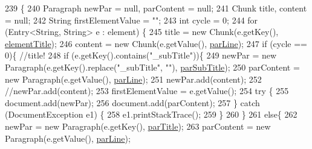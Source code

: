 \begin{DoxyCode}
239                                                                                      \{
240         Paragraph newPar = null, parContent = null;
241         Chunk title, content = null;
242         String firstElementValue = \textcolor{stringliteral}{""};
243         \textcolor{keywordtype}{int} cycle = 0;
244         \textcolor{keywordflow}{for} (Entry<String, String> e : element) \{
245             title = \textcolor{keyword}{new} Chunk(e.getKey(), \hyperlink{classit_1_1isislab_1_1masonassisteddocumentation_1_1mason_1_1control_1_1_pdf_rtf_generator_aa954332a7d987f1b6b8957fa25ee6190}{elementTitle});
246             content = \textcolor{keyword}{new} Chunk(e.getValue(), \hyperlink{classit_1_1isislab_1_1masonassisteddocumentation_1_1mason_1_1control_1_1_pdf_rtf_generator_ae24c4a1666a5d601e16f3c3cb7a81fdb}{parLine});
247             \textcolor{keywordflow}{if} (cycle == 0)\{    \textcolor{comment}{//title!}
248                 \textcolor{keywordflow}{if} (e.getKey().contains(\textcolor{stringliteral}{"\_subTitle"}))\{
249                     newPar = \textcolor{keyword}{new} Paragraph(e.getKey().replace(\textcolor{stringliteral}{"\_subTitle"}, \textcolor{stringliteral}{""}), 
      \hyperlink{classit_1_1isislab_1_1masonassisteddocumentation_1_1mason_1_1control_1_1_pdf_rtf_generator_ae31536bac40b23df15fbb252e60c03bb}{parSubTitle});
250                     parContent = \textcolor{keyword}{new} Paragraph(e.getValue(), \hyperlink{classit_1_1isislab_1_1masonassisteddocumentation_1_1mason_1_1control_1_1_pdf_rtf_generator_ae24c4a1666a5d601e16f3c3cb7a81fdb}{parLine});
251                     newPar.add(content);
252                     \textcolor{comment}{//newPar.add(content);}
253                     firstElementValue = e.getValue();
254                     \textcolor{keywordflow}{try} \{
255                         document.add(newPar);
256                         document.add(parContent);
257                     \} \textcolor{keywordflow}{catch} (DocumentException e1) \{
258                         e1.printStackTrace();
259                     \}
260                 \}
261                 \textcolor{keywordflow}{else}\{
262                     newPar = \textcolor{keyword}{new} Paragraph(e.getKey(), \hyperlink{classit_1_1isislab_1_1masonassisteddocumentation_1_1mason_1_1control_1_1_pdf_rtf_generator_a3f130f576b5be4a3a82d7c59347c0869}{parTitle});
263                     parContent = \textcolor{keyword}{new} Paragraph(e.getValue(), \hyperlink{classit_1_1isislab_1_1masonassisteddocumentation_1_1mason_1_1control_1_1_pdf_rtf_generator_ae24c4a1666a5d601e16f3c3cb7a81fdb}{parLine});

\end{DoxyCode}
